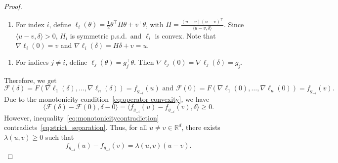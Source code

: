\documentclass[twoside,11pt]{article}
\newcommand{\R}{\mathbb{R}}
\newcommand{\F}{\mathcal{F}}
\begin{document}
\begin{proof}
    \begin{enumerate}[label=$\spadesuit$, ref=($\spadesuit$)]
        \item\label{item:def_R_i} For index $i$, define $\ell_i(\theta) = \frac{1}{2} \theta^\intercal H \theta + v^\intercal \theta$, with $H = \frac{(u-v) (u-v)^\intercal}{\langle u-v, \delta \rangle}$. 
        Since $\langle u-v, \delta \rangle > 0$, $H_i$ is symmetric p.s.d.\ and $\ell_i$ is convex.
        Note that $\nabla \ell_i(0) = v$ and $\nabla \ell_i(\delta) = H \delta + v  = u$.
    \end{enumerate}
    \begin{enumerate}[label=$\clubsuit$, ref=($\clubsuit$)]
        \item\label{item:def_R_j} For indices $j \neq i$, define $\ell_j(\theta) = g_j^\intercal \theta$. 
        Then $\nabla \ell_j(0) = \nabla \ell_j(\delta) = g_j$.
    \end{enumerate}
    Therefore, we get 
    \[
        \F(\delta) = F(\nabla \ell_1(\delta), \ldots, \nabla \ell_n(\delta)) = f_{g_{-i}}(u) \text{ and } \F(0) = F(\nabla \ell_1(0), \ldots, \nabla \ell_n(0)) = f_{g_{-i}}(v).
    \]
    Due to the monotonicity condition~\eqref{eq:operator-convexity}, we have
    \begin{equation}\label{eq:monotonicitycontradiction}
        \langle \F(\delta) - \F(0), \delta - 0 \rangle = \langle f_{g_{-i}}(u) - f_{g_{-i}}(v), \delta \rangle \geq 0.
    \end{equation}
    However, inequality~\eqref{eq:monotonicitycontradiction} contradicts~\eqref{eq:strict_separation}. 
    Thus, for all $u \neq v \in \R^d$, there exists $\lambda(u, v) \geq 0$ such that
    \begin{equation}\label{eq:positivedirectional}
        f_{g_{-i}}(u) - f_{g_{-i}}(v) = \lambda(u,v)(u-v).
    \end{equation}



\end{proof}
\end{document}
